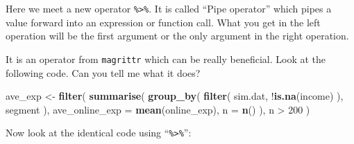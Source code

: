 \documentclass[12pt,]{krantz}
\newenvironment{Shaded}{\begin{snugshade}}{\end{snugshade}}
\newcommand{\KeywordTok}[1]{\textcolor[rgb]{0.13,0.29,0.53}{\textbf{{#1}}}}
\newcommand{\DataTypeTok}[1]{\textcolor[rgb]{0.13,0.29,0.53}{{#1}}}
\newcommand{\DecValTok}[1]{\textcolor[rgb]{0.00,0.00,0.81}{{#1}}}
\newcommand{\StringTok}[1]{\textcolor[rgb]{0.31,0.60,0.02}{{#1}}}
\newcommand{\NormalTok}[1]{{#1}}
\theoremstyle{definition}
\theoremstyle{definition}
\theoremstyle{remark}
\begin{document}
Here we meet a new operator \texttt{\%\textgreater{}\%}. It is called
``Pipe operator'' which pipes a value forward into an expression or
function call. What you get in the left operation will be the first
argument or the only argument in the right operation.

\begin{Shaded}
\end{Shaded}

It is an operator from \texttt{magrittr} which can be really beneficial.
Look at the following code. Can you tell me what it does?

\begin{Shaded}
\begin{Highlighting}[]
\NormalTok{ave_exp <-}\StringTok{ }\KeywordTok{filter}\NormalTok{( }
  \KeywordTok{summarise}\NormalTok{(}
    \KeywordTok{group_by}\NormalTok{( }
      \KeywordTok{filter}\NormalTok{(}
        \NormalTok{sim.dat, }
        \NormalTok{!}\KeywordTok{is.na}\NormalTok{(income)}
      \NormalTok{), }
      \NormalTok{segment}
    \NormalTok{), }
    \DataTypeTok{ave_online_exp =} \KeywordTok{mean}\NormalTok{(online_exp), }
    \DataTypeTok{n =} \KeywordTok{n}\NormalTok{()}
  \NormalTok{), }
  \NormalTok{n >}\StringTok{ }\DecValTok{200}
\NormalTok{) }
\end{Highlighting}
\end{Shaded}

Now look at the identical code using ``\texttt{\%\textgreater{}\%}'':

\begin{Shaded}
\end{Shaded}
\end{document}
